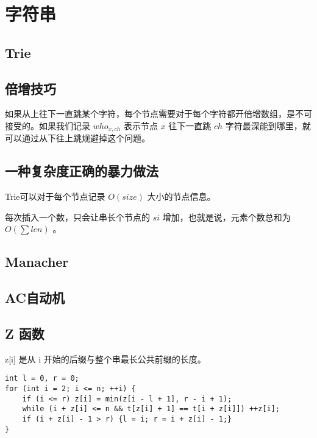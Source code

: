 \section{字符串}

\subsection{Trie}

\subsection*{倍增技巧}

如果从上往下一直跳某个字符，每个节点需要对于每个字符都开倍增数组，是不可接受的。如果我们记录 $who_{x,ch}$ 表示节点 $x$ 往下一直跳 $ch$ 字符最深能到哪里，就可以通过从下往上跳规避掉这个问题。

\subsection*{一种复杂度正确的暴力做法} 

Trie可以对于每个节点记录 $O(size)$ 大小的节点信息。

每次插入一个数，只会让串长个节点的 $si$ 增加，也就是说，元素个数总和为 $O(\sum len)$ 。


\subsection{Manacher}





\subsection{AC自动机}







\subsection{Z 函数}



z[i] 是从 i 开始的后缀与整个串最长公共前缀的长度。

\begin{lstlisting}
int l = 0, r = 0;
for (int i = 2; i <= n; ++i) {
    if (i <= r) z[i] = min(z[i - l + 1], r - i + 1);
    while (i + z[i] <= n && t[z[i] + 1] == t[i + z[i]]) ++z[i];
    if (i + z[i] - 1 > r) {l = i; r = i + z[i] - 1;}  
}
\end{lstlisting}

